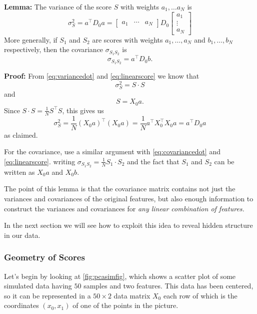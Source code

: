 \documentclass[
]{article}
\begin{document}
\textbf{Lemma:} The variance of the score \(S\) with weights
\(a_1,\ldots a_N\) is \begin{equation}
\sigma_{S}^2 = a^{\intercal}D_{0}a = \left[\begin{matrix}a_{1} & \cdots & a_{N}\end{matrix}\right]D_{0}
\left[\begin{matrix} a_{1} \\ \vdots \\ a_{N}\end{matrix}\right]
\label{eq:ada}\end{equation} More generally, if \(S_{1}\) and \(S_{2}\)
are scores with weights \(a_1,\ldots, a_N\) and \(b_1,\ldots, b_N\)
respectively, then the covariance \(\sigma_{S_{1}S_{2}}\) is \[
\sigma_{S_{1}S_{2}} = a^{\intercal}D_{0}b.
\]

\textbf{Proof:} From \cref{eq:variancedot} and \ref{eq:linearscore} we
know that \[
\sigma_{S}^2 = S\cdot S
\] and \[
S = X_{0}a.
\] Since \(S\cdot S = \frac{1}{N}S^{\intercal}S\), this gives us \[
\sigma_{S}^2 = \frac{1}{N}(X_{0}a)^{\intercal}(X_{0}a) = \frac{1}{N}a^{\intercal}X_{0}^{\intercal}X_{0}a = a^{\intercal}D_{0}a
\] as claimed.

For the covariance, use a similar argument with \cref{eq:covariancedot}
and \cref{eq:linearscore}. writing
\(\sigma_{S_{1}S_{2}}=\frac{1}{N}S_{1}\cdot S_{2}\) and the fact that
\(S_{1}\) and \(S_{2}\) can be written as \(X_{0}a\) and \(X_{0}b\).

The point of this lemma is that the covariance matrix contains not just
the variances and covariances of the original features, but also enough
information to construct the variances and covariances for \emph{any
linear combination of features.}

In the next section we will see how to exploit this idea to reveal
hidden structure in our data.

\hypertarget{geometry-of-scores}{%
\subsubsection{Geometry of Scores}\label{geometry-of-scores}}

Let's begin by looking at \cref{fig:pcasimfig}, which shows a scatter
plot of some simulated data having \(50\) samples and two features. This
data has been centered, so it can be represented in a \(50\times 2\)
data matrix \(X_{0}\) each row of which is the coordinates \((x_0,x_1)\)
of one of the points in the picture.
\end{document}
